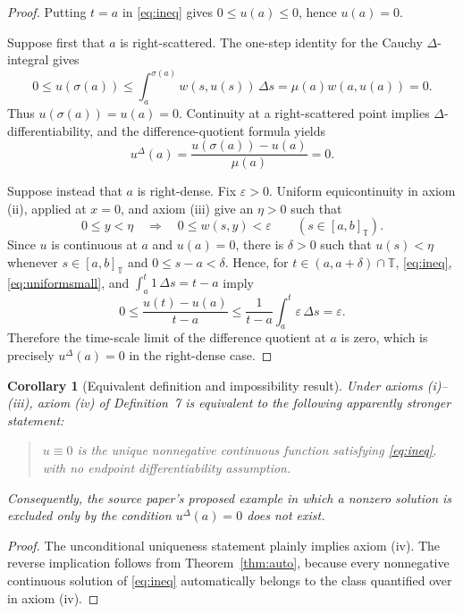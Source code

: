 \documentclass[11pt]{article}
\newtheorem{corollary}{Corollary}
\newcommand{\T}{\mathbb T}
\newcommand{\Deltas}{\,\Delta s}
\newcommand{\muT}{\mu}
\begin{document}
\begin{proof}
Putting $t=a$ in \eqref{eq:ineq} gives $0\leq u(a)\leq0$, hence $u(a)=0$.

Suppose first that $a$ is right-scattered.  The one-step identity for the
Cauchy $\Delta$-integral gives
\[
 0\leq u(\sigma(a))
 \leq \int_a^{\sigma(a)}w(s,u(s))\Deltas
 =\muT(a)w(a,u(a))
 =0.
\]
Thus $u(\sigma(a))=u(a)=0$.  Continuity at a right-scattered point implies
$\Delta$-differentiability, and the difference-quotient formula yields
\[
 u^\Delta(a)=\frac{u(\sigma(a))-u(a)}{\muT(a)}=0.
\]

Suppose instead that $a$ is right-dense.  Fix $\varepsilon>0$.  Uniform
equicontinuity in axiom (ii), applied at $x=0$, and axiom (iii) give an
$\eta>0$ such that
\begin{equation}\label{eq:uniformsmall}
 0\leq y<\eta
 \quad\Longrightarrow\quad
 0\leq w(s,y)<\varepsilon
 \qquad(s\in[a,b]_{\T}).
\end{equation}
Since $u$ is continuous at $a$ and $u(a)=0$, there is $\delta>0$ such that
$u(s)<\eta$ whenever $s\in[a,b]_{\T}$ and $0\leq s-a<\delta$.  Hence, for
$t\in(a,a+\delta)\cap\T$, \eqref{eq:ineq},
\eqref{eq:uniformsmall}, and $\int_a^t1\Deltas=t-a$ imply
\[
 0\leq \frac{u(t)-u(a)}{t-a}
 \leq \frac1{t-a}\int_a^t\varepsilon\Deltas
 =\varepsilon.
\]
Therefore the time-scale limit of the difference quotient at $a$ is zero,
which is precisely $u^\Delta(a)=0$ in the right-dense case.
\end{proof}

\begin{corollary}[Equivalent definition and impossibility result]
Under axioms (i)--(iii), axiom (iv) of Definition~7 is equivalent to the
following apparently stronger statement:
\begin{quote}
$u\equiv0$ is the unique nonnegative continuous function satisfying
\eqref{eq:ineq}, with no endpoint differentiability assumption.
\end{quote}
Consequently, the source paper's proposed example in which a nonzero solution
is excluded only by the condition $u^\Delta(a)=0$ does not exist.
\end{corollary}

\begin{proof}
The unconditional uniqueness statement plainly implies axiom (iv).  The
reverse implication follows from Theorem~\ref{thm:auto}, because every
nonnegative continuous solution of \eqref{eq:ineq} automatically belongs to
the class quantified over in axiom (iv).
\end{proof}
\end{document}
